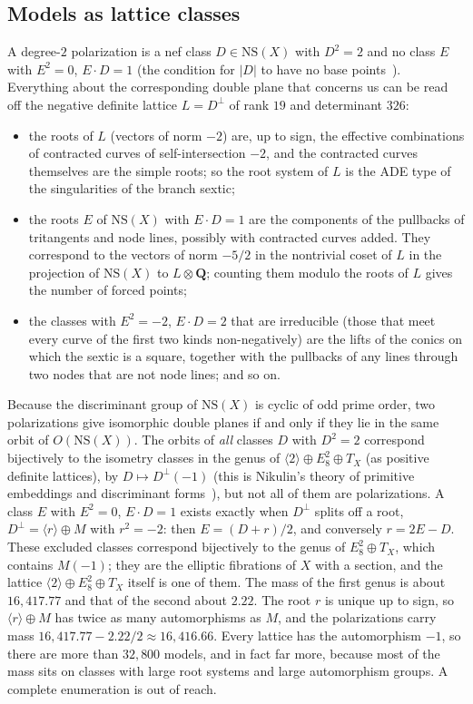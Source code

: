 \documentclass[11pt]{article}
\newcommand{\Q}{\mathbf{Q}}
\newcommand{\NS}{\mathrm{NS}}
\newcommand{\X}{X}
\theoremstyle{remark}
\begin{document}
\subsection*{Models as lattice classes}
A degree-$2$ polarization is a nef class $D\in\NS(\X)$ with $D^2=2$ and no class $E$ with $E^2=0$, $E\cdot D=1$
(the condition for $|D|$ to have no base points~\cite{SaintDonat}).
Everything about the corresponding double plane that concerns us can be read off the negative definite lattice
$L=D^\perp$ of rank $19$ and determinant $326$:
\begin{itemize}\itemsep 1pt
\item the roots of $L$ (vectors of norm $-2$) are, up to sign, the effective combinations of contracted curves of
self-intersection $-2$, and the contracted curves themselves are the simple roots; so the root system of $L$ is the
ADE type of the singularities of the branch sextic;
\item the roots $E$ of $\NS(\X)$ with $E\cdot D=1$ are the components of the pullbacks of tritangents and node lines, possibly with contracted curves added.  They
correspond to the vectors of norm $-5/2$ in the nontrivial coset of $L$ in the projection of $\NS(\X)$ to $L\otimes\Q$;
counting them modulo the roots of $L$ gives the number of forced points;
\item the classes with $E^2=-2$, $E\cdot D=2$ that are irreducible (those that meet every curve of the first two kinds
non-negatively) are the lifts of the conics on which the sextic is a square, together with the pullbacks of any lines through two
nodes that are not node lines; and so on.
\end{itemize}
Because the discriminant group of $\NS(\X)$ is cyclic of odd prime order, two polarizations give isomorphic double planes if
and only if they lie in the same orbit of $O(\NS(\X))$.  The orbits of \emph{all} classes $D$ with $D^2=2$ correspond
bijectively to the isometry classes in the genus of $\langle 2\rangle\oplus E_8^2\oplus T_\X$ (as positive definite lattices),
by $D\mapsto D^\perp(-1)$ (this is Nikulin's theory of primitive embeddings and discriminant forms~\cite{Nikulin}), but not all of
them are polarizations.  A class $E$ with $E^2=0$, $E\cdot D=1$ exists exactly when
$D^\perp$ splits off a root, $D^\perp=\langle r\rangle\oplus M$ with $r^2=-2$: then $E=(D+r)/2$, and conversely $r=2E-D$.
These excluded classes correspond bijectively to the genus of $E_8^2\oplus T_\X$, which contains $M(-1)$; they are the elliptic
fibrations of $\X$ with a section, and the lattice $\langle 2\rangle\oplus E_8^2\oplus T_\X$ itself is one of them.  The mass of the
first genus is about $16{,}417.77$ and that of the second about $2.22$.  The root $r$ is unique up to sign, so
$\langle r\rangle\oplus M$ has twice as many automorphisms as $M$, and the polarizations carry mass
$16{,}417.77-2.22/2\approx 16{,}416.66$.  Every lattice has the automorphism $-1$, so there are more than $32{,}800$ models, and in
fact far more, because most of the mass sits on classes with large root systems and large automorphism groups.  A complete
enumeration is out of reach.
\end{document}
